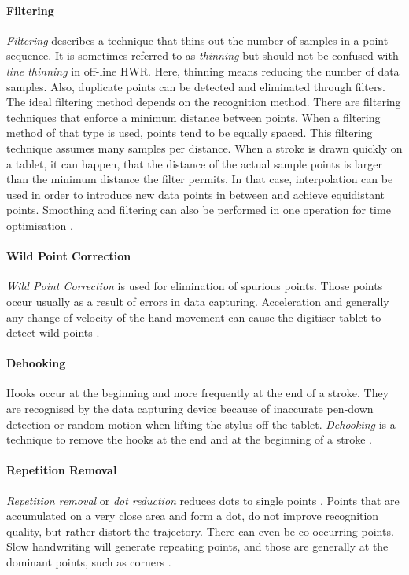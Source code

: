 \paragraph{Filtering}
\label{sec:filtering}
\emph{Filtering} describes a technique that thins out the number of samples in 
a point sequence. It is sometimes referred to as \emph{thinning} but should not 
be confused with \emph{line thinning} in off-line HWR. Here, thinning means 
reducing the number of data samples. Also, duplicate points can be detected
and eliminated through filters.
The ideal filtering method depends on the recognition method. There are 
filtering techniques that enforce a minimum distance between points. When a 
filtering method of that type is used, points tend to be equally spaced.
This filtering technique assumes many samples per distance. When a stroke is 
drawn quickly on a tablet, it can happen, that the distance of the actual sample 
points is larger than the minimum distance the filter permits. In that case,
interpolation can be used in order to introduce new data points in between and
achieve equidistant points. Smoothing and filtering can also be performed in one 
operation for time optimisation .

\paragraph{Wild Point Correction}
\label{sec:wildpointcorrection}
\emph{Wild Point Correction} is used for elimination of spurious points. Those 
points occur usually as a result of errors in data capturing. Acceleration and 
generally any change of velocity of the hand movement can cause the digitiser 
tablet to detect wild points .

\paragraph{Dehooking}
\label{sec:dehooking}
Hooks occur at the beginning and more frequently at the end of a stroke. They
are recognised by the data capturing device because of inaccurate pen-down 
detection or random motion when lifting the stylus off the tablet.
\emph{Dehooking} is a technique to remove the hooks at the end and at the 
beginning of a stroke .

\paragraph{Repetition Removal}
\label{sec:repetitionremoval}
\emph{Repetition removal} or \emph{dot reduction} reduces dots to single points
. Points that are accumulated on a very close area and 
form a dot, do not improve recognition quality, but rather distort the 
trajectory. There can even be co-occurring points. Slow handwriting will generate
repeating points, and those are generally at the dominant points, such as
corners .

